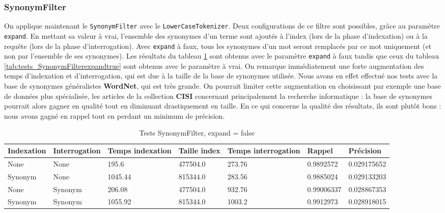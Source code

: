 \subsubsection{SynonymFilter}

On applique maintenant le \texttt{SynonymFilter} avec le \texttt{LowerCaseTokenizer}. Deux configurations de ce filtre sont possibles, grâce au paramètre \texttt{expand}. En mettant sa valeur à vrai, l'ensemble des synonymes d'un terme sont ajoutés à l'index (lors de la phase d'indexation) ou à la requête (lors de la phase d'interrogation). Avec \texttt{expand} à faux, tous les synonymes d'un mot seront remplacés par ce mot uniquement (et non par l'ensemble de ses synonymes). Les résultats du tableau \ref{tab:tests_SynonymFilterexpandfalse} sont obtenus avec le paramètre \texttt{expand} à faux tandis que ceux du tableau \ref{tab:tests_SynonymFilterexpandtrue} sont obtenus avec le paramètre à vrai. On remarque immédiatement une forte augmentation des temps d'indexation et d'interrogation, qui est due à la taille de la base de synonymes utilisée. Nous avons en effet effectué nos tests avec la base de synonymes généralistes \textbf{WordNet}, qui est très grande. On pourrait limiter cette augmentation en choisissant par exemple une base de données plus spécialisée, les articles de la collection \textbf{CISI} concernant principalement la recherche informatique : la base de synonymes pourrait alors gagner en qualité tout en diminuant drastiquement en taille. En ce qui concerne la qualité des résultats, ils sont plutôt bons : nous avons gagné en rappel tout en perdant un minimum de précision.

\begin{table}[!htbp]
    \hspace{-2cm}
                \begin{tabular}{|p{2.5cm}|p{2.5cm}|p{2cm}|p{2cm}|p{2.5cm}|p{2cm}|p{2cm}|}
                    \hline
                    \textbf{Indexation} & \textbf{Interrogation} & \textbf{Temps \mbox{indexation}} & \textbf{Taille \mbox{index}} & \textbf{Temps \mbox{interrogation}} & \textbf{Rappel} & \textbf{Précision}\\
                    \hline
                    None & None & 195.6 & 477504.0 & 273.76 & 0.9892572 & 0.029175652\\
                    \hline
Synonym & None & 1045.44 & 815344.0 & 283.56 & 0.9885024 & 0.029133203\\
		            \hline
None & Synonym & 206.08 & 477504.0 & 932.76 & 0.99006337 & 0.028867353\\
		            \hline
Synonym & Synonym & 1055.92 & 815344.0 & 1003.2 & 0.9912973 & 0.028918015\\
                    \hline
                \end{tabular}
                \caption{Tests SynonymFilter, expand = false}
                \label{tab:tests_SynonymFilterexpandfalse}
            \end{table}

